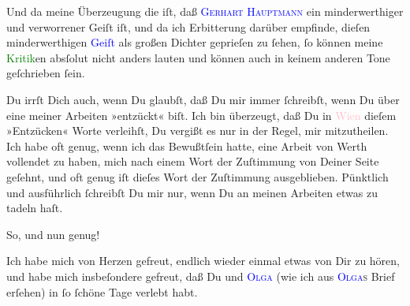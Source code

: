                Und da meine Überzeugung die iſt, daß \textsc{\textcolor{blue}{Gerhart Hauptmann}{}\ledrightnote{\textcolor{blue}{Gerhart Hauptmann}}} ein minderwerthiger {\pb}und verworrener Geiſt
               iſt, und da ich Erbitterung darüber empfinde, dieſen minderwerthigen \textcolor{blue}{Geiſt}{}\ledrightnote{{$\rightarrow$}\textcolor{blue}{Gerhart Hauptmann}} als großen Dichter
               geprieſen zu ſehen, ſo \strikeout{\textcolor{gray}{ſ}} können meine \textcolor{green}{Kritik}{}\ledrightnote{{$\rightarrow$}\textcolor{green}{Berliner Theater. »Einsame Menschen« im Deutschen Theater}}en
               absſolut nicht anders lauten und können auch in keinem anderen Tone geſchrieben
               ſein.\pend
           
\pstart
           Du irrſt Dich auch, wenn Du glaubſt, daß Du mir immer ſchreibſt, wenn Du über eine
               meiner Arbeiten »entzückt« biſt. Ich bin überzeugt, daß Du in \textcolor{pink}{Wien}{}\ledrightnote{\textcolor{pink}{Wien}} dieſem »Entzücken« Worte verleihſt, Du vergißt es nur in
               der {\pb}Regel, mir mitzutheilen. Ich habe oft genug, wenn
               ich das Bewußtſein hatte, eine Arbeit von Werth vollendet zu haben, mich nach einem
               Wort der Zuſtimmung von Deiner Seite geſehnt, und oft genug iſt dieſes Wort der
               Zuſtimmung ausgeblieben. Pünktlich und ausführlich ſchreibſt Du mir nur, wenn Du an
               meinen Arbeiten etwas zu tadeln haſt.\pend
           
\pstart
           So, und nun genug!\pend
           
\pstart
           Ich habe mich von Herzen gefreut, endlich wieder einmal etwas von Dir zu hören, und
               habe mich insbeſondere gefreut, {\pb}daß Du und \textsc{\textcolor{blue}{Olga}{}\ledrightnote{\textcolor{blue}{Olga Schnitzler}}} (wie ich aus \textsc{\textcolor{blue}{Olga}{}\ledrightnote{\textcolor{blue}{Olga Schnitzler}}s} Brief erſehen) in \label{K_L03091-4v}\label{K_L03091-4h} ſo ſchöne Tage verlebt
               habt.\pend
           
